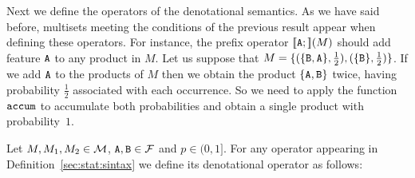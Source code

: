 Next we define the operators of the denotational semantics. As we have said before, multisets
meeting the conditions of the previous result appear when
defining these operators. For instance, the prefix operator
$[\![{\mathtt{A}};]\!](M)$ should add feature ${\mathtt{A}}$ to any product in $M$. Let us
suppose that
$M=\{
   (\{{\mathtt{B}},{\mathtt{A}}\},\frac{1}{2}),
   (\{{\mathtt{B}}\},\frac{1}{2})\}$.
If we add ${\mathtt{A}}$ to the products of $M$ then we obtain the product
$\{{\mathtt{A}},{\mathtt{B}}\}$ twice, having probability $\frac{1}{2}$ associated with each occurrence. So we
need to apply the function $\mathtt{accum}$ to accumulate both probabilities
and obtain a single product with probability~$1$.


\bdfn\label{def:semantic:operators}
  Let $M,M_1,M_2\in{\cal M}$, ${\mathtt{A}},{\mathtt{B}}\in{\cal F}$ and $p\in(0,1]$. For any operator appearing in
  Definition~\ref{sec:stat:sintax} we define its denotational operator
  as follows:
